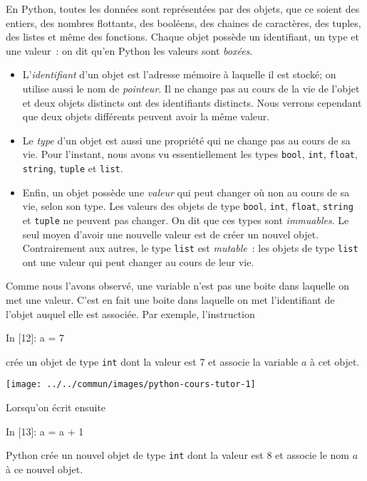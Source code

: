 \documentclass{magnolia}
\begin{document}
En Python, toutes les données sont représentées par des objets, que ce soient des entiers, des nombres
flottants, des booléens, des chaines de caractères, des tuples, des listes et même des fonctions. Chaque
objet possède un identifiant, un type et une valeur~: on dit qu'en Python les valeurs sont \emph{boxées}.
\begin{itemize}
\item L'\emph{identifiant} d'un objet est l'adresse mémoire à laquelle il est stocké; on utilise aussi
  le nom de \emph{pointeur}. Il ne change pas au cours de la vie de l'objet et deux objets
  distincts ont des identifiants distincts. Nous verrons cependant que deux objets différents peuvent
  avoir la même valeur.
\item Le \emph{type} d'un objet est aussi une propriété qui ne change pas au cours de sa vie. Pour l'instant, nous
  avons vu essentiellement les types \verb!bool!, \verb!int!, \verb!float!, \verb!string!, \verb!tuple! et \verb!list!.
\item Enfin, un objet possède une \emph{valeur} qui peut changer où non au cours de sa vie, selon son type.
  Les valeurs des objets de type \verb_bool_, \verb_int_, \verb_float_, \verb_string_ et \verb!tuple! ne peuvent
  pas changer. On dit que ces types sont \emph{immuables}. Le seul moyen d'avoir une nouvelle valeur est de
  créer un nouvel objet. Contrairement aux autres, le type \verb!list! est \emph{mutable}~: les objets
  de type \verb!list! ont une valeur qui peut changer au cours de leur vie.
\end{itemize}

\vspace{2ex}
Comme nous l'avons observé, une variable n'est pas une boite dans laquelle on met une valeur.
C'est en fait une boite dans laquelle on met l'identifiant de l'objet auquel elle est associée. Par exemple,
l'instruction

\begin{pythoncode}
In [12]: a = 7
\end{pythoncode} 
\noindent
crée un objet de type \verb_int_ dont la valeur est 7 et associe la variable $a$ à cet objet.

\begin{center}
\texttt{[image: ../../commun/images/python-cours-tutor-1]}
\end{center}

\noindent Lorsqu'on écrit ensuite

\begin{pythoncode}
In [13]: a = a + 1   
\end{pythoncode}
\noindent
Python crée un nouvel objet de type \verb_int_ dont la valeur est 8 et associe le nom $a$ à ce nouvel objet.
\end{document}
